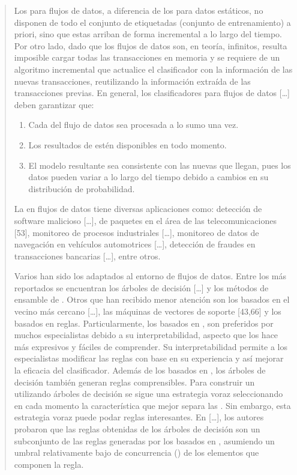 \begin{quote}
Los \clasificadores para flujos de datos, a diferencia de los \clasificadores para datos estáticos, no disponen de todo el conjunto de \transacciones etiquetadas (conjunto de entrenamiento) a priori, sino que estas arriban de forma incremental a lo largo del tiempo. Por otro lado, dado que los flujos de datos son, en teoría, infinitos, resulta imposible cargar todas las transacciones en memoria y se requiere de un algoritmo incremental que actualice el clasificador con la información de las nuevas transacciones, reutilizando la información extraída de las transacciones previas. En general, los clasificadores para flujos de datos [\ldots] deben garantizar que:

\begin{enumerate}
  \item Cada \transaccion del flujo de datos sea procesada a lo sumo una vez.
  \item Los resultados de \clasificacion estén disponibles en todo momento.
  \item El modelo resultante sea consistente con las nuevas \transacciones que llegan, pues los datos pueden variar a lo largo del tiempo debido a cambios en su distribución de probabilidad.
\end{enumerate}

La \clasificacion en flujos de datos tiene diversas aplicaciones como: detección de software malicioso [\ldots], \clasificacion de paquetes en el área de las telecomunicaciones [53], monitoreo de procesos industriales [\ldots], monitoreo de datos de navegación en vehículos automotrices [\ldots], detección de fraudes en transacciones bancarias [\ldots], entre otros.

Varios han sido los \clasificadores adaptados al entorno de flujos de datos. Entre los más reportados se encuentran los árboles de decisión [\ldots] y los métodos de ensamble de \clasificadores [\ldots]. Otros \clasificadores que han recibido menor atención son los basados en el vecino más cercano [\ldots], las máquinas de vectores de soporte [43,66] y los basados en reglas. Particularmente, los \clasificadores basados en \CARs, son preferidos por muchos especialistas debido a su interpretabilidad, aspecto que los hace más expresivos y fáciles de comprender. Su interpretabilidad permite a los especialistas modificar las reglas con base en su experiencia y así mejorar la eficacia del clasificador. Además de los \clasificadores basados en \CARs, los árboles de decisión también generan reglas comprensibles. Para construir un \clasificador utilizando árboles de decisión se sigue una estrategia voraz seleccionando en cada momento la característica que mejor separa las \clases. Sin embargo, esta estrategia voraz puede podar reglas interesantes. En [\ldots], los autores probaron que las reglas obtenidas de los árboles de decisión son un subconjunto de las reglas generadas por los \clasificadores basados en \CARs, asumiendo un umbral relativamente bajo de concurrencia (\Soporte) de los elementos que componen la regla.
\end{quote}

